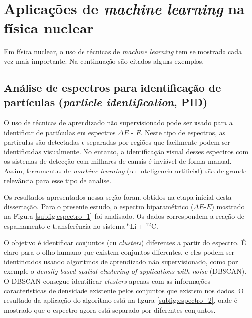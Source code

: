 \documentclass[a4paper,12pt,oneside]{book}
\begin{document}
\section{Aplicações de \textit{machine learning} na física nuclear}

\par Em física nuclear, o uso de técnicas de \textit{machine learning} tem se mostrado cada vez mais importante. Na continuação são citados alguns exemplos.

\subsection{Análise de espectros para identificação de partículas (\textit{particle identification}, PID)}

\par O uso de técnicas de aprendizado não supervisionado pode ser usado para a identificar de partículas em espectros $\Delta E$ - $E$. Neste tipo de espectros, as partículas são detectadas e separadas por regiões que facilmente podem ser identificadas visualmente\cite{DETC_TELE}. No entanto, a identificação visual desses espectros com os sistemas de detecção com milhares de canais é inviável de forma manual. Assim, ferramentas de \textit{machine learning} (ou inteligencia artificial) são de grande relevância para esse tipo de analise.

Os resultados apresentados nessa seção foram obtidos na etapa inicial desta dissertação. Para o presente estudo, o espectro biparamétrico ($\Delta E$-$E$) mostrado na Figura \ref{subfig:espectro_1} foi analisado. Os dados correspondem a reação de espalhamento e transferência no sistema $^{6}$Li +  $^{12}$C.



\par O objetivo é identificar conjuntos (ou \textit{clusters}) diferentes a partir do espectro. É claro para o olho humano que existem conjuntos diferentes, e eles podem ser identificados usando algoritmos de aprendizado não supervisionado, como por exemplo o \textit{density-based spatial clustering of applications with noise} (DBSCAN)\cite{dbscan}. O DBSCAN consegue identificar \textit{clusters} apenas com as informações características de densidade existente pelos conjuntos que existem nos dados. O resultado da aplicação do algoritmo está na figura \ref{subfig:espectro_2}, onde é mostrado que o espectro agora está separado por diferentes conjuntos.
\end{document}
